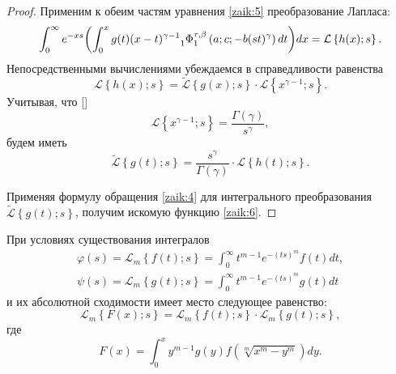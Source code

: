\smallskip

\begin{proof}	
Применим к обеим частям уравнения \eqref{zaik:5} преобразование Лапласа:
$$
\int_0^{\infty}e^{-xs}\biggl(\int_0^x g(t)(x-t)^{\gamma-1} {\mathstrut}_1\Phi{\mathstrut}_1^{\tau,\beta}\left(a; c; -b(st)^{\gamma}\right)dt\biggr)dx=\mathcal L\left\{h(x);s\right\}. 
$$
Непосредственными вычислениями убеждаемся в справедливости равенства
$$
\mathcal L\left\{h(x);s\right\}=\widetilde{\mathcal L}\left\{g(x);s\right\}\cdot \mathcal L\left\{x^{\gamma-1};s\right\}.
$$	
Учитывая, что [] 
$$
\mathcal L\left\{x^{\gamma-1};s\right\}=\frac{\Gamma(\gamma)}{s^{\gamma}},
$$ будем иметь
$$
\widetilde{\mathcal L}\left\{g(t);s\right\}=\frac{s^{\gamma}}{\Gamma(\gamma)}\cdot \mathcal L\left\{h(t);s\right\}.
$$

Применяя формулу обращения \eqref{zaik:4} для интегрального преобразования \linebreak $\widetilde{\mathcal L}\left\{g(t);s\right\}$, получим искомую функцию \eqref{zaik:6}.
\end{proof}

\smallskip

\begin{theorem}[2]При условиях существования интегралов
\begin{gather*}
\varphi(s)=\mathcal L_m\left\{f(t);s\right\}=\int_0^{\infty}t^{m-1}e^{-(ts)^m}f(t)dt, 
\\
\psi(s)=\mathcal L_m\left\{g(t);s\right\}=\int_0^{\infty}t^{m-1}e^{-(ts)^m}g(t)dt
\end{gather*}
и их абсолютной сходимости имеет место следующее равенство\/{\rm:}
\begin{equation}
\label{zaik:7} 
   \mathcal L_m\left\{F(x);s\right\}=\mathcal L_m\left\{f(t);s\right\}\cdot \mathcal L_m\left\{g(t);s\right\},
    \end{equation} 
где
    $$F(x)=\int_0^{x}y^{m-1}g(y)f\left(\sqrt[m]{x^m-y^m}\right)dy.$$
\end{theorem}

\smallskip

